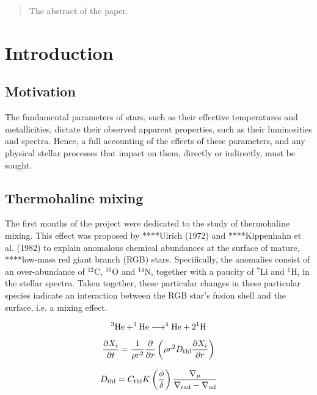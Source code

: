 \documentclass{mnras}
\begin{document}
\begin{abstract}
The abstract of the paper.
\end{abstract}

\section{Introduction}
\subsection{Motivation}
The fundamental parameters of stars, such as their effective temperatures and metallicities, dictate their observed apparent properties, such as their luminosities and spectra. Hence, a full accounting of the effects of these parameters, and any physical stellar processes that impact on them, directly or indirectly, must be sought.

\subsection{Thermohaline mixing}
The first months of the project were dedicated to the study of thermohaline mixing. This effect was proposed by ****Ulrich (1972) and ****Kippenhahn et al. (1982) to explain anomalous chemical abundances at the surface of mature, ****low-mass red giant branch (RGB) stars. Specifically, the anomalies consist of an over-abundance of $^{12}$C, $^{16}$O and $^{14}$N, together with a paucity of $^{7}$Li and $^{1}$H, in the stellar spectra. Taken together, these particular changes in these particular species indicate an interaction between the RGB star's fusion shell and the surface, i.e. a mixing effect.

\begin{equation}
^{3}\textnormal{He} + ^{3}\textnormal{He} \longrightarrow ^{4}\textnormal{He} + 2^{1}\textnormal{H}
\label{He3_fusion}
\end{equation}

\begin{equation}
\frac{\partial X_{i}}{\partial t} = \frac{1}{\rho r^{2}}\frac{\partial}{\partial r} \left( \rho r^{2} D_{\textnormal{thl}} \frac{\partial X_{i}}{\partial r} \right)
\label{diffusion_eq}
\end{equation}

\begin{equation}
D_{\textnormal{thl}} = C_{\textnormal{thl}} K \left( \frac{\phi}{\delta} \right) \frac{\nabla _{\mu}}{\nabla _{\textnormal{rad}} - \nabla _{\textnormal{ad}}}
\label{Dthl_def}
\end{equation}
\end{document}
